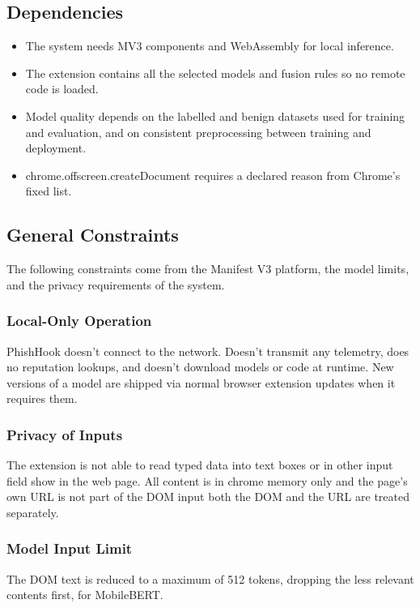 \documentclass{FastFyp}
\begin{document}
\subsection{Dependencies}
\begin{itemize}
    \item The system needs MV3 components and WebAssembly for local inference.
    \item The extension contains all the selected models and fusion rules so no remote code is loaded.
    \item Model quality depends on the labelled and benign datasets used for training and evaluation, and on consistent preprocessing between training and deployment.
    \item chrome.offscreen.createDocument requires a declared reason from Chrome's fixed list.
\end{itemize}

\subsection{General Constraints}
The following constraints come from the Manifest V3 platform, the model limits, and the privacy requirements of the system.

\subsubsection{Local-Only Operation}
PhishHook doesn't connect to the network. Doesn't transmit any telemetry, does no reputation lookups, and doesn't download models or code at runtime. New versions of a model are shipped via normal browser extension updates when it requires them.

\subsubsection{Privacy of Inputs}
The extension is not able to read typed data into text boxes or in other input field show in the web page. All content is in chrome memory only and the page's own URL is not part of the DOM input both the DOM and the URL are treated separately.

\subsubsection{Model Input Limit}
The DOM text is reduced to a maximum of 512 tokens, dropping the less relevant contents first, for MobileBERT.
\end{document}
